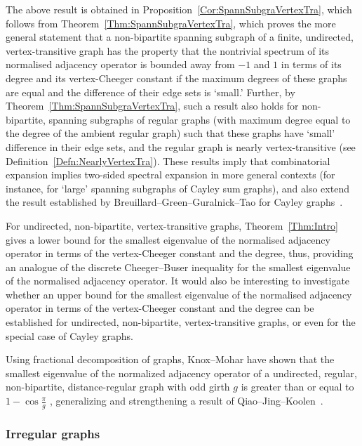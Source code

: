 The above result is obtained in Proposition~\ref{Cor:SpannSubgraVertexTra}, which follows from Theorem~\ref{Thm:SpannSubgraVertexTra}, which proves the more general statement that a non-bipartite spanning subgraph of a finite, undirected, vertex-transitive graph has the property that the nontrivial spectrum of its normalised adjacency operator is bounded away from $-1$ and $1$ in terms of its degree and its vertex-Cheeger constant if the maximum degrees of these graphs are equal and the difference of their edge sets is `small.' Further, by Theorem~\ref{Thm:SpannSubgraVertexTra}, such a result also holds for non-bipartite, spanning subgraphs of regular graphs (with maximum degree equal to the degree of the ambient regular graph) such that these graphs have `small' difference in their edge sets, and the regular graph is nearly vertex-transitive (see Definition~\ref{Defn:NearlyVertexTra}). These results imply that combinatorial expansion implies two-sided spectral expansion in more general contexts (for instance, for `large' spanning subgraphs of Cayley sum graphs), and also extend the result  established by Breuillard--Green--Guralnick--Tao for Cayley graphs~\cite[Appendix E]{BGGTExpansionSimpleLie}. 

For undirected, non-bipartite, vertex-transitive graphs, Theorem~\ref{Thm:Intro} gives a lower bound for the smallest eigenvalue of the normalised adjacency operator in terms of the vertex-Cheeger constant and the degree, thus, providing an analogue of the discrete Cheeger--Buser inequality for the smallest eigenvalue of the normalised adjacency operator. It would also be interesting to investigate whether an upper bound for the smallest eigenvalue of the normalised adjacency operator in terms of the vertex-Cheeger constant and the degree can be established for undirected, non-bipartite, vertex-transitive graphs, or even for the special case of Cayley graphs. 

Using fractional decomposition of graphs, Knox--Mohar have shown that the smallest eigenvalue of the normalized adjacency operator of a undirected, regular, non-bipartite, distance-regular graph with odd girth $g$ is greater than or equal to $1 - \cos \frac \pi g$ 
\cite[Corollary 5]{KnoxMoharFractionalDecomSmallestEigenVal}, generalizing and strengthening a result of Qiao--Jing--Koolen~\cite[Theorem 1]{QiaoJingKoolenNonBipartiteDistRegular}.


\subsubsection{Irregular graphs}
\label{Subsubsec:IrregularGraphs}

